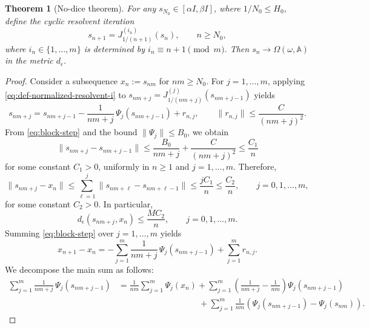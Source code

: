 \documentclass[12pt,reqno]{amsart}
\newtheorem{theorem}{Theorem}[section]
\begin{document}
\begin{theorem}[No-dice theorem]\label{T:Nodice}
For any \(s_{N_0} \in [\alpha I,\beta I]\), where $1/N_0 \leq H_0$, define the cyclic resolvent iteration
\begin{equation}\label{eq:cyclic-iteration-BW}
s_{n+1} = J_{1/(n+1)}^{(i_n)}(s_n),
\qquad
n \ge N_{0},
\end{equation}
where \( i_n \in \{1,\dots,m\} \) is determined by
$i_n \equiv n+1 \pmod m$.
Then
$s_n \to \Omega (\omega, \mathbb{A})$
in the metric $d_\epsilon$.
\end{theorem}

\begin{proof}
Consider a subsequence
$x_n := s_{nm}$ for $nm \ge N_0$.
For \( j=1,\dots,m \),
applying \eqref{eq:def-normalized-resolvent-i} to $s_{nm+j} = J_{1/(nm+j)}^{(j)}(s_{nm+j-1})$ yields
\begin{equation}\label{eq:block-step}
s_{nm+j}
=
s_{nm+j-1} - \frac1{nm+j} \, \Psi_j(s_{nm+j-1}) + r_{n,j},
\qquad
\| r_{n,j} \| \le \frac{C}{(nm+j)^2}.
\end{equation}
From \eqref{eq:block-step} and the bound \( \| \Psi_j \| \le B_0 \), we obtain
\[
\| s_{nm+j}-s_{nm+j-1} \|
\le \frac{B_0}{nm+j} + \frac{C}{(nm+j)^2}
\le \frac{C_1}{n}
\]
for some constant \( C_1 > 0 \), uniformly in \(n \ge 1\) and \( j=1,\dots,m \).
Therefore,
\begin{equation*}\label{eq:intermediate-close}
\| s_{nm+j}-x_n \|
\le
\sum_{\ell=1}^j \| s_{nm+\ell}-s_{nm+\ell-1} \|
\le
\frac{jC_1}{n}
\le \frac{C_2}{n},
\qquad j=0,1,\dots,m,
\end{equation*}
for some constant \( C_2 > 0 \). In particular,
\begin{equation}\label{eq:metric-intermediate-close}
d_\epsilon(s_{nm+j}, x_n) \le \frac{MC_2}{n},
\qquad j=0,1,\dots,m.
\end{equation}
Summing \eqref{eq:block-step} over \(j=1,\dots,m\) yields
\[
x_{n+1}-x_n
=
- \sum_{j=1}^m \frac1{nm+j} \, \Psi_j(s_{nm+j-1})
+ \sum_{j=1}^m r_{n,j}.
\]
We decompose the main sum as follows:
\begin{align*}
\sum_{j=1}^m \frac1{nm+j} \, \Psi_j(s_{nm+j-1})
& =
\frac1{nm}\sum_{j=1}^m \Psi_j(x_n) + \sum_{j=1}^m
\left( \frac1{nm+j} - \frac1{nm} \right) \Psi_j(s_{nm+j-1}) \\
& \hspace{4cm} + \sum_{j=1}^{m} \frac{1}{nm} \left( \Psi_j(s_{nm+j-1}) - \Psi_j(s_{nm}) \right).
\end{align*}

\end{proof}
\end{document}
